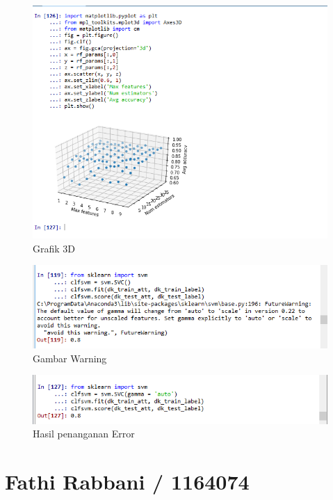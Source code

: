 \begin{figure}
      \centerline{\includegraphics[width=1\textwidth]
      {figures/cokro/c68}}
      \caption{Grafik 3D}
      \label{c68}
      \end{figure}

\begin{figure}
      \centerline{\includegraphics[width=1\textwidth]
      {figures/cokro/c69}}
      \caption{Gambar Warning}
      \label{c69}
      \end{figure}

\begin{figure}
      \centerline{\includegraphics[width=1\textwidth]
      {figures/cokro/c70}}
      \caption{Hasil penanganan Error}
      \label{c70}
      \end{figure}


\section{Fathi Rabbani / 1164074}

